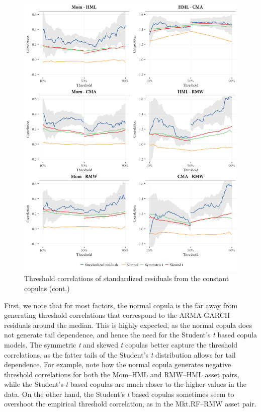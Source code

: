 \begin{figure}[!ht]
  \ContinuedFloat
  \centering
  \includegraphics[scale=1]{graphics/threshold_simulated_2.png}  
  \footnotesize
  \caption{Threshold correlations of standardized residuals from the constant copulas (cont.)}
\end{figure}
\pagebreak

First, we note that for most factors, the normal copula is the far away from generating threshold correlations that correspond to the ARMA-GARCH residuals around the median. This is highly expected, as the normal copula does not generate tail dependence, and hence the need for the Student's \textit{t} based copula models. The symmetric \textit{t} and skewed \textit{t} copulas better capture the threshold correlations, as the fatter tails of the Student's \textit{t} distribution allows for tail dependence. For example, note how the normal copula generates negative threshold correlations for both the Mom--HML and RMW--HML asset pairs, while the Student's \textit{t} based copulas are much closer to the higher values in the data. On the other hand, the Student's \textit{t} based copulas sometimes seem to overshoot the empirical threshold correlation, as in the Mkt.RF--RMW asset pair.

